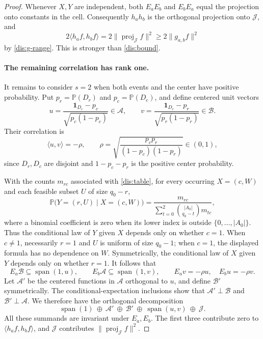 \begin{proof}
Whenever $X,Y$ are independent, both $E_aE_b$ and $E_bE_a$ equal the
projection onto constants in the cell. Consequently $h_a h_b$ is the
orthogonal projection onto $\mathcal J$, and
\[
 2\langle h_a f,h_b f\rangle
   =2\|\operatorname{proj}_{\mathcal J}f\|^2
   \ge 2\|g_{a,b}f\|^2
\]
by \eqref{dis:g-range}. This is stronger than \eqref{dis:bound}.

\paragraph{The remaining correlation has rank one.}
It remains to consider $s=2$ when both events and the center have
positive probability. Put $p_r=\mathbb P(D_r)$ and
$p_c=\mathbb P(D_c)$, and define centered unit vectors
\[
 u=\frac{\mathbf 1_{D_c}-p_c}{\sqrt{p_c(1-p_c)}}\in\mathcal A,
 \qquad
 v=\frac{\mathbf 1_{D_r}-p_r}{\sqrt{p_r(1-p_r)}}\in\mathcal B.
\]
Their correlation is
\begin{equation}\label{dis:rho}
 \langle u,v\rangle=-\rho,\qquad
 \rho=\sqrt{\frac{p_cp_r}{(1-p_c)(1-p_r)}}\in(0,1),
\end{equation}
since $D_r,D_c$ are disjoint and $1-p_c-p_r$ is the positive center
probability.

With the counts $m_{rc}$ associated with \eqref{dis:table}, for every
occurring $X=(c,W)$ and each feasible subset $U$ of size $q_0-r$,
\[
 \mathbb P\bigl(Y=(r,U)\mid X=(c,W)\bigr)
 =\frac{m_{rc}}{\displaystyle\sum_{t=0}^2
       \binom{|A_0|}{q_0-t}m_{tc}},
\]
where a binomial coefficient is zero when its lower index is outside
$\{0,\ldots,|A_0|\}$. Thus the conditional law of $Y$ given $X$
depends only on whether $c=1$. When $c\ne1$, necessarily $r=1$ and
$U$ is uniform of size $q_0-1$; when $c=1$, the displayed formula has
no dependence on $W$.
Symmetrically, the conditional law of $X$ given $Y$ depends only on
whether $r=1$. It follows that
\[
 E_a\mathcal B\subseteq\operatorname{span}(1,u),\qquad
 E_b\mathcal A\subseteq\operatorname{span}(1,v),\qquad
 E_a v=-\rho u,\quad E_b u=-\rho v.
\]
Let $\mathcal A'$ be the centered functions in $\mathcal A$
orthogonal to $u$, and define $\mathcal B'$ symmetrically. The
conditional-expectation inclusions show that
$\mathcal A'\perp\mathcal B$ and $\mathcal B'\perp\mathcal A$.
We therefore have the orthogonal decomposition
\begin{equation}\label{dis:decomposition}
 \operatorname{span}(1)\ \oplus\ \mathcal A'\ \oplus\
 \mathcal B'\ \oplus\ \operatorname{span}(u,v)\ \oplus\ \mathcal J.
\end{equation}
All these summands are invariant under $E_a,E_b$. The first three
contribute zero to $\langle h_a f,h_b f\rangle$, and $\mathcal J$
contributes $\|\operatorname{proj}_{\mathcal J}f\|^2$.


\end{proof}
